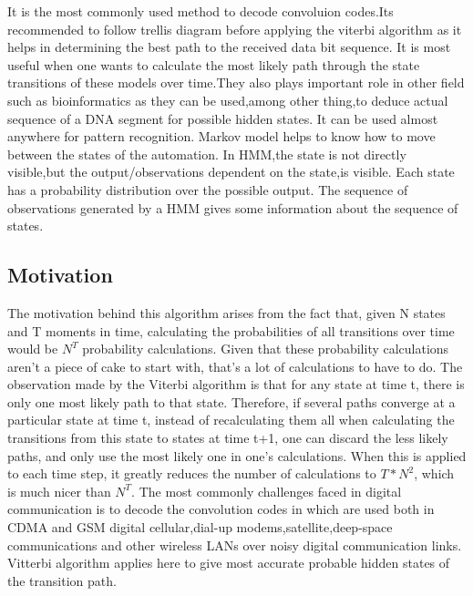 \documentclass[12pt,journal,compsoc]{IEEEtran}
\begin{document}
% 
% 
% 
% 
It is the most commonly used method to decode convoluion codes.Its recommended   to   follow   trellis   diagram   before   applying   the   viterbi algorithm as it helps in determining the best path to the received data
bit sequence. It is most useful when one wants to calculate the most
likely path through the state transitions of these models over time.They
also plays important role in other field such as bioinformatics as they
can be used,among other thing,to deduce actual sequence of a DNA
segment for possible hidden states. It can be used almost anywhere for
pattern recognition.
Markov model helps to know how to move between the states of the
automation.   In   HMM,the   state   is   not   directly   visible,but   the
output/observations dependent on the state,is visible. Each state has a
probability   distribution   over   the   possible   output.   The   sequence   of
observations generated by a HMM gives some information about the
sequence of states.\\
\subsection{Motivation}
The motivation behind this algorithm arises from the fact that, given N
states   and   T   moments   in   time,   calculating   the   probabilities   of   all
transitions over time would be $N^T$ probability calculations. Given that
these probability calculations aren't a piece of cake to start with, that's
a lot of calculations to have to do.
The observation made by the Viterbi algorithm is that for any state at
time t, there is only one most likely path to that state. Therefore, if
several paths   converge   at   a   particular   state   at   time   t,   instead of recalculating them all when calculating the transitions from this state to
states at time t+1, one can discard the less likely paths, and only use
the most likely one in one's calculations. When this is applied to each
time step, it greatly reduces the number of calculations to $T*N^2$, which
is much nicer than $N^T$. The most commonly challenges faced in digital communication is to decode the convolution codes in which are used both in CDMA and GSM digital cellular,dial-up modems,satellite,deep-space communications and
other wireless LANs over noisy digital communication links. Vitterbi algorithm applies here to give most accurate probable hidden states of
the transition path.
\end{document}
